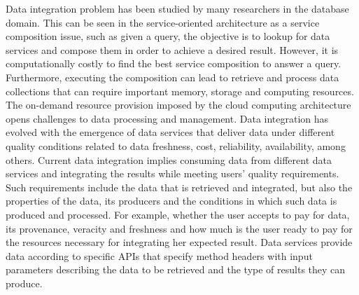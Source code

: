 Data integration problem has been studied by many researchers in the database domain.
This can be seen in the service-oriented architecture as a service composition issue, such as given a query, the objective is to lookup for data services and compose them in order to achieve a desired result. 
%
However, it is computationally costly to find the best service composition to answer a query. 
Furthermore, executing the composition can lead to retrieve and process data collections that can require important memory, storage and computing resources.
The on-demand resource provision imposed by the cloud computing architecture opens challenges to data processing and management.
Data integration has evolved with the emergence of data services that
deliver data under different quality conditions related to data freshness, cost, reliability,
availability, among others.  Current data integration implies consuming data
from different data services and integrating the results while meeting users' quality requirements. Such
requirements include the data that is retrieved and integrated, but also the
properties of the data, its producers and the conditions in which such data is
produced and processed. For example, whether the user accepts to pay for data,
its provenance, veracity and freshness and how much is the user ready to pay for
the resources necessary for integrating her expected result. Data services
provide data according to specific APIs that specify method headers with input
parameters describing the data to be retrieved and the type of results they can
produce.         

